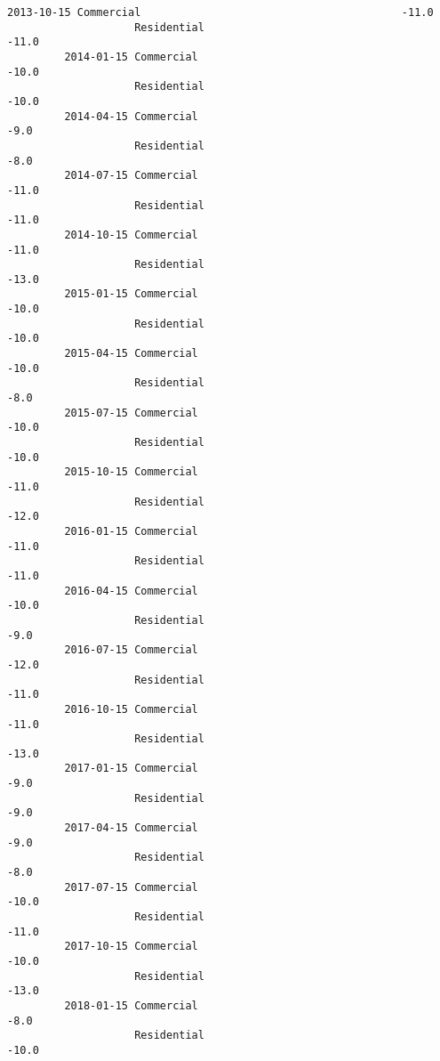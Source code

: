 \documentclass[11pt]{article}
\begin{document}
\begin{Verbatim}[commandchars=\\\{\}]
         2013-10-15 Commercial                                         -11.0   
                    Residential                                        -11.0   
         2014-01-15 Commercial                                         -10.0   
                    Residential                                        -10.0   
         2014-04-15 Commercial                                          -9.0   
                    Residential                                         -8.0   
         2014-07-15 Commercial                                         -11.0   
                    Residential                                        -11.0   
         2014-10-15 Commercial                                         -11.0   
                    Residential                                        -13.0   
         2015-01-15 Commercial                                         -10.0   
                    Residential                                        -10.0   
         2015-04-15 Commercial                                         -10.0   
                    Residential                                         -8.0   
         2015-07-15 Commercial                                         -10.0   
                    Residential                                        -10.0   
         2015-10-15 Commercial                                         -11.0   
                    Residential                                        -12.0   
         2016-01-15 Commercial                                         -11.0   
                    Residential                                        -11.0   
         2016-04-15 Commercial                                         -10.0   
                    Residential                                         -9.0   
         2016-07-15 Commercial                                         -12.0   
                    Residential                                        -11.0   
         2016-10-15 Commercial                                         -11.0   
                    Residential                                        -13.0   
         2017-01-15 Commercial                                          -9.0   
                    Residential                                         -9.0   
         2017-04-15 Commercial                                          -9.0   
                    Residential                                         -8.0   
         2017-07-15 Commercial                                         -10.0   
                    Residential                                        -11.0   
         2017-10-15 Commercial                                         -10.0   
                    Residential                                        -13.0   
         2018-01-15 Commercial                                          -8.0   
                    Residential                                        -10.0   
         

\end{Verbatim}
\end{document}
